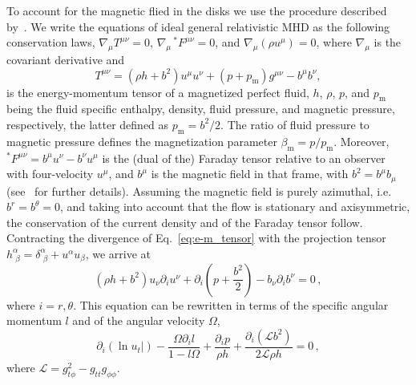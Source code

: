 \documentclass[twocolumn,aps,showpacs,showkeys,prd,superscriptaddress,byrevtex, amsmath]{revtex4-1}
\begin{document}
To account for the magnetic flied in the disks we use the procedure described by~\cite{Komissarov:2006,Montero:2007}. We write the equations of ideal general relativistic MHD as the following conservation laws, $\nabla_{\mu} T^{\mu\nu} = 0$, $\nabla_{\mu} \,^\ast F^{\mu\nu} = 0$, and 
$\nabla_{\mu} (\rho u^{\mu}) = 0$, 
where $\nabla_{\mu}$ is the covariant derivative and
\begin{equation}\label{eq:e-m_tensor}
T^{\mu\nu} = (\rho h + b^2)u^{\mu}u^{\nu} + (p + p_{\mathrm{m}})g^{\mu\nu} - b^{\mu}b^{\nu},
\end{equation}
is the energy-momentum tensor of a magnetized perfect fluid, $h$, $\rho$, $p$, and $p_{\mathrm{m}}$ being the fluid specific enthalpy, density, fluid pressure, and magnetic pressure, respectively, the latter defined as $p_{\mathrm{m}} = b^2/2$. The ratio of fluid pressure to magnetic pressure defines the magnetization parameter $\beta_{\mathrm{m}} = p/p_{\mathrm{m}}$.
Moreover, $^\ast F^{\mu\nu} = b^{\mu}u^{\nu} - b^{\nu}u^{\mu}$ is the (dual of the) Faraday tensor relative to an observer with 
four-velocity $u^{\mu}$, and $b^{\mu}$ is the magnetic field in that frame, with
$b^2=b^{\mu}b_{\mu}$ (see~\cite{Anton:2006} for further details). Assuming the magnetic field is purely azimuthal, i.e.~$b^r = b^{\theta} = 0$,
and taking into account that the flow is stationary and axisymmetric, the conservation of the current density and of the Faraday tensor follow. Contracting the divergence of Eq.~\eqref{eq:e-m_tensor} with the projection tensor $h^{\alpha}_{\,\,\beta} = \delta^{\alpha}_{\,\,\beta} + u^{\alpha}u_{\beta}$, we arrive at
\begin{equation}
(\rho h + b^2)u_{\nu}\partial_i u^{\nu} + \partial_i\left(p + \frac{b^2}{2}\right) - b_{\nu}\partial_i b^{\nu}=0\,,
\end{equation}
where $i = r, \theta$. This equation can be rewritten in terms of the specific angular momentum $l$ and of the angular velocity $\Omega$, 
\begin{equation}\label{eq:diff_ver}
\partial_i(\ln u_t|) - \frac{\Omega \partial_i l}{1-l\Omega} + \frac{\partial_i p}{\rho h} + \frac{\partial_i(\mathcal{L}b^2)}{2\mathcal{L}\rho h} = 0\,,
\end{equation}
where $\mathcal{L} = g_{t\phi}^2 - g_{tt}g_{\phi\phi}$.
\end{document}
